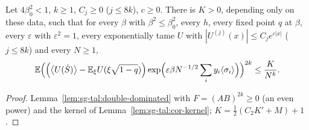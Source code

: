 \begin{theorem}
\label{thm:sg-tal:mul-exp}
  \leanok
{}
Let $4\beta_0^2<1$, $k\ge1$, $C_j\ge0$ ($j\le8k$), $c\ge0$.  There is $K>0$, depending only on these data, such that for every $\beta$ with $\beta^2\le\beta_0^2$, every $h$, every fixed point $q$ at $\beta$, every $\varepsilon$ with $\varepsilon^2=1$, every exponentially tame $U$ with $|U^{(j)}(x)|\le C_je^{c|x|}$ ($j\le8k$) and every $N\ge1$,
\[
\mathbb E\Bigl(\Bigl(\bigl\langle U(\dot S)\bigr\rangle-\mathbb E_\xi U(\xi\sqrt{1-q})\Bigr)\exp\Bigl(\varepsilon\beta N^{-1/2}\sum_iy_i\langle\sigma_i\rangle\Bigr)\Bigr)^{2k}\le\frac K{N^k}.
\]
\end{theorem}
\begin{proof}
  \leanok
Lemma~\ref{lem:sg-tal:double-dominated} with $F=(AB)^{2k}\ge0$ (an even power) and the kernel of Lemma~\ref{lem:sg-tal:cor-kernel}; $K=\frac12(C_2K'+M)+1$.
\end{proof}

